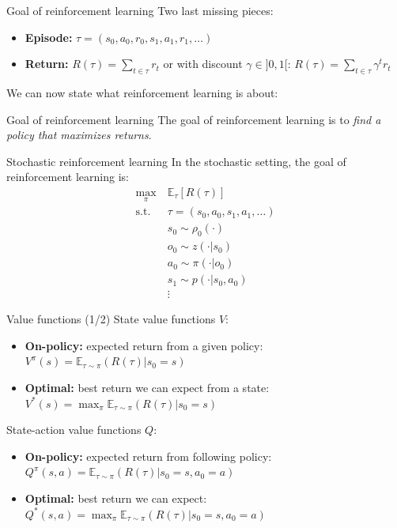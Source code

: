 \documentclass[10pt, aspectratio=1610]{beamer}
\begin{document}
\begin{frame}{Goal of reinforcement learning}
    Two last missing pieces:
    \begin{itemize}
        \item \textbf{Episode:} $\tau = (s_0, a_0, r_0, s_1, a_1, r_1, \ldots)$
        \item \textbf{Return:} $R(\tau) = \sum_{t \in \tau} r_t$ or with discount $\gamma \in ]0, 1[$: $R(\tau) = \sum_{t \in \tau} \gamma^t r_t$
    \end{itemize}
    We can now state what reinforcement learning is about:

    \vspace{1ex}
    \begin{block}{Goal of reinforcement learning}
        The goal of reinforcement learning is to \emph{find a policy that maximizes returns}.
    \end{block}
\end{frame}

\begin{frame}{Stochastic reinforcement learning}
    In the stochastic setting, the goal of reinforcement learning is:
    \begin{align*}
        \max_{\pi} \ & \mathbb{E}_{\tau} [R(\tau)] \\
        \mathrm{s.t.} \ & \tau = (s_0, a_0, s_1, a_1, \ldots) \\
        & s_0 \sim \rho_0(\cdot) \\
        & o_0 \sim z(\cdot | s_0) \\
        & a_0 \sim \pi(\cdot | o_0) \\
        & s_1 \sim p(\cdot | s_0, a_0) \\
        & \vdots
    \end{align*}
\end{frame}

\begin{frame}{Value functions (1/2)}
    State value functions $V$:
    \begin{itemize}
        \item \textbf{On-policy:} expected return from a given policy: $V^\pi(s) = \mathbb{E}_{\tau \sim \pi}(R(\tau) | s_0 = s)$
        \item \textbf{Optimal:} best return we can expect from a state: $V^*(s) = \max_\pi \mathbb{E}_{\tau \sim \pi}(R(\tau) | s_0 = s)$
    \end{itemize}
    State-action value functions $Q$:
    \begin{itemize}
        \item \textbf{On-policy:} expected return from following policy: $Q^\pi(s, a) = \mathbb{E}_{\tau \sim \pi}(R(\tau) | s_0 = s, a_0 = a)$
        \item \textbf{Optimal:} best return we can expect: $Q^*(s, a) = \max_\pi \mathbb{E}_{\tau \sim \pi}(R(\tau) | s_0 = s, a_0 = a)$
    \end{itemize}
\end{frame}
\end{document}
